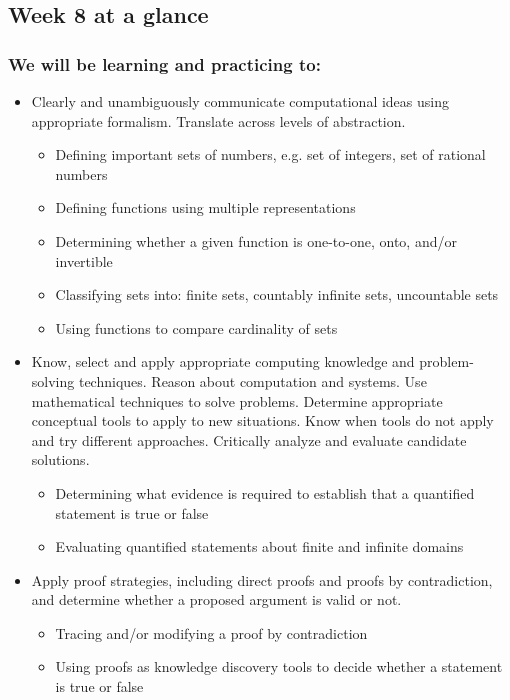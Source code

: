 \documentclass[12pt, oneside]{article}
\begin{document}
\begin{flushright}
\end{flushright} 
\subsection*{Week 8 at a glance}

\subsubsection*{We will be learning and practicing to:}
\begin{itemize}

\item Clearly and unambiguously communicate computational ideas using appropriate formalism. Translate across levels of abstraction.
\begin{itemize}
    \item Defining important sets of numbers, e.g. set of integers, set of rational numbers
    \item Defining functions using multiple representations
    \item Determining whether a given function is one-to-one, onto, and/or invertible
    \item Classifying sets into: finite sets, countably infinite sets, uncountable sets
    \item Using functions to compare cardinality of sets
\end{itemize}

\item Know, select and apply appropriate computing knowledge and problem-solving techniques. Reason about computation and systems. Use mathematical techniques to solve problems. Determine appropriate conceptual tools to apply to new situations. Know when tools do not apply and try different approaches. Critically analyze and evaluate candidate solutions.
\begin{itemize}
    \item Determining what evidence is required to establish that a quantified statement is true or false
    \item Evaluating quantified statements about finite and infinite domains
\end{itemize}

\item Apply proof strategies, including direct proofs and proofs by contradiction, and determine whether a proposed argument is valid or not.
\begin{itemize}
    \item Tracing and/or modifying a proof by contradiction
    \item Using proofs as knowledge discovery tools to decide whether a statement is true or false
\end{itemize}
\end{itemize}
\end{document}
